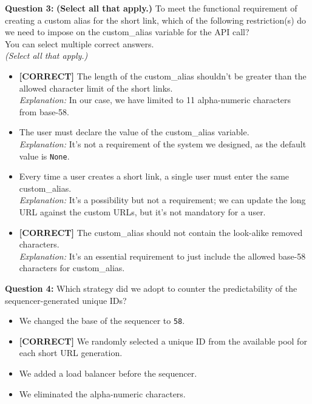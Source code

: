 \vspace{0.3cm}
\noindent
\textbf{Question 3:} \textbf{(Select all that apply.)} To meet the functional requirement of creating a custom alias for the short link, which of the following restriction(s) do we need to impose on the custom\_alias variable for the API call?
\\
You can select multiple correct answers.
\\
\textit{(Select all that apply.)}
\\[0.2cm]
\begin{itemize}
 \item \textbf{[CORRECT]} The length of the custom\_alias shouldn't be greater than the allowed character limit of the short links.
\\[0.1cm]
\textit{Explanation:} 
In our case, we have limited to 11 alpha-numeric characters from base-58.
 \item The user must declare the value of the custom\_alias variable.
\\[0.1cm]
\textit{Explanation:} 
It's not a requirement of the system we designed, as the default value is \texttt{None}.
 \item Every time a user creates a short link, a single user must enter the same custom\_alias.
\\[0.1cm]
\textit{Explanation:} 
It's a possibility but not a requirement; we can update the long URL against the custom URLs, but it's not mandatory for a user.
 \item \textbf{[CORRECT]} The custom\_alias should not contain the look-alike removed characters.
\\[0.1cm]
\textit{Explanation:} 
It's an essential requirement to just include the allowed base-58 characters for custom\_alias.
\end{itemize}
\vspace{0.3cm}
\noindent
\textbf{Question 4:} Which strategy did we adopt to counter the predictability of the sequencer-generated unique IDs?
\\[0.2cm]
\begin{itemize}
 \item We changed the base of the sequencer to \texttt{58}.
 \item \textbf{[CORRECT]} We randomly selected a unique ID from the available pool for each short URL generation.
 \item We added a load balancer before the sequencer.
 \item We eliminated the alpha-numeric characters.
\end{itemize}

